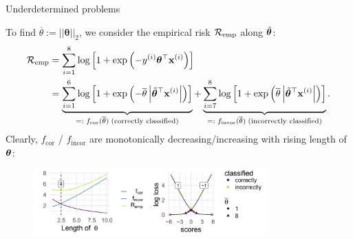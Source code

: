 \begin{vbframe} {Underdetermined problems}
\begin{footnotesize}
To find $\overline{\theta} := ||\bm{\theta}||_2$, we consider the empirical risk $\mathcal{R}_{\text{emp}}$ along $\tilde{\bm{\theta}}$:
\begin{align*}
\mathcal{R}_{\text{emp}} &= \sum^8_{i=1} \log \left[1 + \exp \left(-y^{(i)}\bm{\theta}^\top \mathbf{x}^{(i)}\right)\right] \\
&= \underbrace{\sum^6_{i=1} \log \left[1 + \exp \left(- \overline{\theta} \left|\tilde{\bm{\theta}}^\top \mathbf{x}^{(i)}\right|\right)\right]}_{=: \; f_{\text{cor}}(\overline{\theta}) \;\text{(correctly classified)}} +
\underbrace{\sum^8_{i=7}\log \left[1 + \exp \left( \overline{\theta} \left| \tilde{\bm{\theta}}^\top \mathbf{x}^{(i)}\right|\right)\right]}_{=:\; f_{\text{incor}}(\overline{\theta}) \;\text{(incorrectly classified)}}.
\end{align*}
Clearly, $f_{\text{cor}}$ / $f_{\text{incor}}$ are monotonically decreasing/increasing with rising length of $\bm{\theta}$:

\begin{figure}
\includegraphics[width=0.8\textwidth]{figure_man/undet-problem02.png}\\
\end{figure}


\end{footnotesize}
\end{vbframe}
